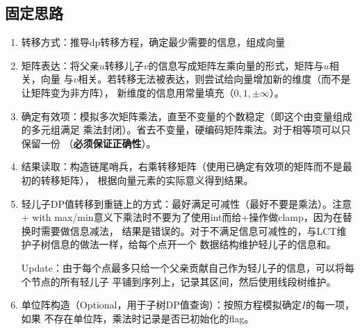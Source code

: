 \subsection{固定思路}
\begin{enumerate}
    \item 转移方式：推导dp转移方程，确定最少需要的信息，组成向量
    \item 矩阵表达：将父亲$u$转移儿子$v$的信息写成矩阵左乘向量的形式，矩阵与$u$相关，向量
    与$v$相关。若转移无法被表达，则尝试给向量增加新的维度（而不是让矩阵变为非方阵），
    新维度的信息用常量填充（$0,1,\pm \infty$）。
    \item 确定有效项：模拟多次矩阵乘法，直至不变量的个数稳定（即这个由变量组成的多元组满足
    乘法封闭）。省去不变量，硬编码矩阵乘法。对于相等项可以只保留一份
    （{\bfseries 必须保证正确性}）。
    \item 结果读取：构造链尾哨兵，右乘转移矩阵（使用已确定有效项的矩阵而不是最初的转移矩阵），
    根据向量元素的实际意义得到结果。
    \item 轻儿子DP值转移到重链上的方式：最好满足可减性（最好不要是乘法）。注意+ with
    max/min意义下乘法时不要为了使用int而给+操作做clamp，因为在替换时需要做信息减法，
    结果是错误的。对于不满足信息可减性的，与LCT维护子树信息的做法一样，给每个点开一个
    数据结构维护轻儿子的信息和。

    Update：由于每个点最多只给一个父亲贡献自己作为轻儿子的信息，可以将每个节点的所有轻儿子
    平铺到序列上，记录其区间，然后使用线段树维护。
    \item 单位阵构造（Optional，用于子树DP值查询）：按照方程模拟确定$I$的每一项，如果
    不存在单位阵，乘法时记录是否已初始化的flag。
\end{enumerate}
